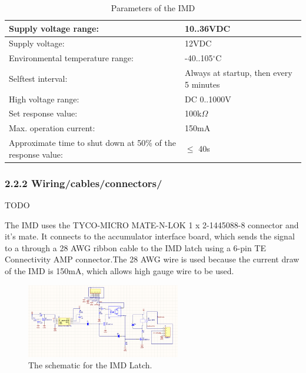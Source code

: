 \documentclass{article}
\begin{document}
\begin{center}
	\begin{table}[H]
		\begin{tabular}{|l|l|}
			\hline
			Supply voltage range: &  10..36VDC \\
			\hline
			Supply voltage: &  12VDC\\
			\hline
			Environmental temperature range: &  -40..105$^{\circ}$C \\
			\hline
			Selftest interval: &  Always at startup, then every 5 minutes \\
			\hline
			High voltage range: &  DC 0..1000V \\
			\hline
			Set response value: &  100k$\Omega$ \\
			\hline
			Max. operation current: &  150mA \\
			\hline
			Approximate time to shut down at 50\% of the response value:&  $\leq$ 40s \\
			\hline
		\end{tabular}
		\caption{Parameters of the IMD}
		\label{IMDParameters}
	\end{table}
\end{center}





\subsubsection*{2.2.2 Wiring/cables/connectors/}
TODO

The  IMD uses the TYCO-MICRO MATE-N-LOK 1 x 2-1445088-8 connector and it's mate. It connects to the accumulator interface board, which sends the signal to a through a 28 AWG ribbon cable to the IMD latch using a 6-pin TE Connectivity AMP connector.The 28 AWG wire is used because the current draw of the IMD is 150mA, which allows high gauge wire to be used.

\begin{figure} [!ht]
	\centering  %
	
	\includegraphics[width=0.6\textwidth]{IMD_Latch_Rev2_AltiumSchematic.png}
	
	\caption{The schematic for the IMD Latch.}
	
	\label{fig:IMDLatch_Schematic}
\end{figure}
\end{document}
